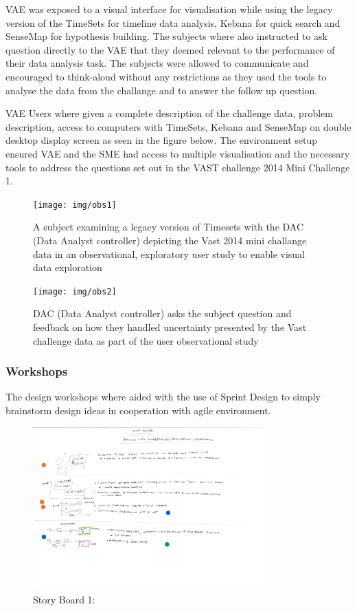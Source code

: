 \documentclass[journal]{vgtc}                %
\begin{document}
VAE was exposed to a visual interface for visualisation while using the legacy version of the TimeSets for timeline data analysis, Kebana for quick search and SenseMap for hypothesis building. The subjects where also instructed to ask question directly to the VAE that they deemed relevant to the performance of their data analysis task. The subjects were allowed to communicate and encouraged to think-aloud without any restrictions as they used the tools to analyse the data from the challange and to  answer the follow up question.

VAE Users where given a complete description of the challenge data, problem description, access to computers with TimeSets, Kebana and SenseMap on double desktop display screen as seen in the figure below. The environment setup ensured VAE and the SME had access to multiple visualisation and the necessary tools to address the questions set out in the VAST challenge 2014 Mini Challenge 1.

\begin{figure}[htb]
 \centering
 \texttt{[image: img/obs1]}
 \caption{A subject examining a legacy version of Timesets with the DAC (Data Analyst controller) depicting the Vast 2014 mini challange data in an observational, exploratory user study to enable visual data exploration}
\end{figure}

\begin{figure}[htb]
 \centering
 \texttt{[image: img/obs2]}
 \caption{DAC (Data Analyst controller) asks the subject question and feedback on how they handled uncertainty presented by the Vast challenge data as part of the user observational study }
\end{figure}

\subsubsection{Workshops}
The design workshops where aided with the use of Sprint Design to simply brainstorm design ideas in cooperation with agile environment.

\begin{figure}[htb]
 \centering
 \includegraphics[width=3.5in]{img/adrian}
 \caption{ Story Board 1: }
\end{figure}
\end{document}
